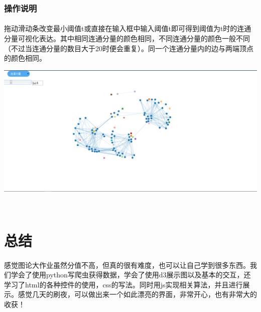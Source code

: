 \documentclass{article}
\begin{document}
\begin{CJK}{UTF8}{gkai}
		\subsubsection{操作说明} %
			\paragraph{}
			拖动滑动条改变最小阈值t或直接在输入框中输入阈值t即可得到阈值为t时的连通分量可视化表达。其中相同连通分量的颜色相同，不同连通分量的颜色一般不同（不过当连通分量的数目大于20时便会重复）。同一个连通分量内的边与两端顶点的颜色相同。
		\\[\intextsep] 
		\begin{minipage}{\textwidth} 
		    \centering 
		    \includegraphics[width=0.9\linewidth]{connected_component.PNG}
		\end{minipage} 
		\\[\intextsep] 		

\section{总结} %
	\paragraph{}
	感觉图论大作业虽然分值不高，但真的很有难度，也可以让自己学到很多东西。我们学会了使用python写爬虫获得数据，学会了使用d3展示图以及基本的交互，还学习了html的各种控件的使用，css的写法。同时用js实现相关算法，并且进行展示。感觉几天的刷夜，可以做出来一个如此漂亮的界面，非常开心，也有非常大的收获！
		

\end{CJK}
\end{document}
